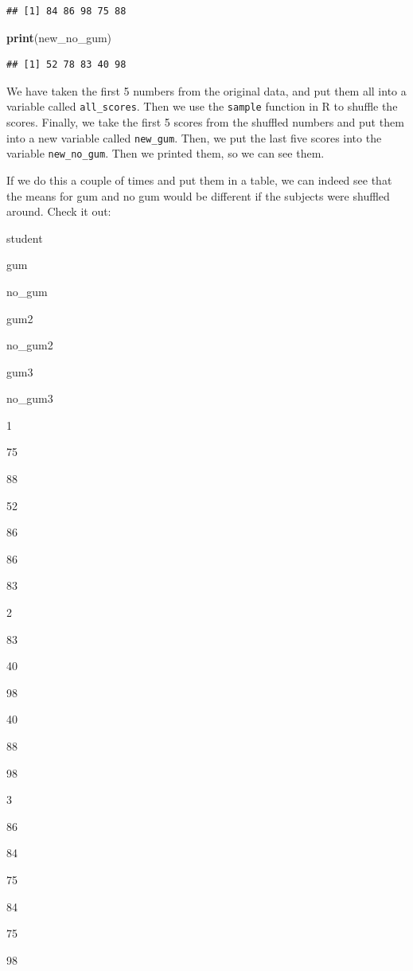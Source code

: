 \documentclass[
]{book}
\newenvironment{Shaded}{\begin{snugshade}}{\end{snugshade}}
\newcommand{\KeywordTok}[1]{\textcolor[rgb]{0.13,0.29,0.53}{\textbf{#1}}}
\newcommand{\NormalTok}[1]{#1}
\begin{document}
\begin{verbatim}
## [1] 84 86 98 75 88
\end{verbatim}

\begin{Shaded}
\begin{Highlighting}[]
\KeywordTok{print}\NormalTok{(new_no_gum)}
\end{Highlighting}
\end{Shaded}

\begin{verbatim}
## [1] 52 78 83 40 98
\end{verbatim}

We have taken the first 5 numbers from the original data, and put them all into a variable called \texttt{all\_scores}. Then we use the \texttt{sample} function in R to shuffle the scores. Finally, we take the first 5 scores from the shuffled numbers and put them into a new variable called \texttt{new\_gum}. Then, we put the last five scores into the variable \texttt{new\_no\_gum}. Then we printed them, so we can see them.

If we do this a couple of times and put them in a table, we can indeed see that the means for gum and no gum would be different if the subjects were shuffled around. Check it out:

student

gum

no\_gum

gum2

no\_gum2

gum3

no\_gum3

1

75

88

52

86

86

83

2

83

40

98

40

88

98

3

86

84

75

84

75

98
\end{document}
